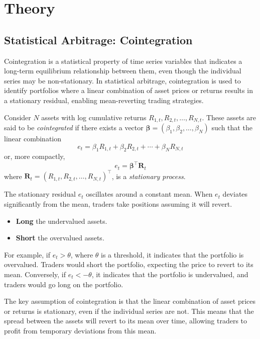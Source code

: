 \documentclass[12pt]{article}
\begin{document}

\section{Theory}

\subsection{Statistical Arbitrage: Cointegration}

Cointegration is a statistical property of time series variables that indicates a long-term equilibrium relationship between them, even though the individual series may be non-stationary. In statistical arbitrage, cointegration is used to identify portfolios where a linear combination of asset prices or returns results in a stationary residual, enabling mean-reverting trading strategies. 

Consider $N$ assets with log cumulative returns $R_{1,t}, R_{2,t}, \ldots, R_{N,t}$. These assets are said to be \textit{cointegrated} if there exists a vector $\boldsymbol{\beta} = (\beta_1, \beta_2, \ldots, \beta_N)$ such that the linear combination
\[
    e_t = \beta_1 R_{1,t} + \beta_2 R_{2,t} + \cdots + \beta_N R_{N,t}
\]
or, more compactly,
\begin{equation}
    e_t = \boldsymbol{\beta}^\top \mathbf{R}_t
    \label{eq:cointegration_all}
\end{equation}
where $\mathbf{R}_t = (R_{1,t}, R_{2,t}, \ldots, R_{N,t})^\top$, is a \textit{stationary process}.

The stationary residual $e_t$ oscillates around a constant mean. When $e_t$ deviates significantly from the mean, traders take positions assuming it will revert.
\begin{itemize}
  \item \textbf{Long} the undervalued assets.
  \item \textbf{Short} the overvalued assets.
\end{itemize}

For example, if $e_t > \theta$, where $\theta$ is a threshold, it indicates that the portfolio is overvalued. Traders would short the portfolio, expecting the price to revert to its mean. Conversely, if $e_t < -\theta$, it indicates that the portfolio is undervalued, and traders would go long on the portfolio.

The key assumption of cointegration is that the linear combination of asset prices or returns is stationary, even if the individual series are not. This means that the spread between the assets will revert to its mean over time, allowing traders to profit from temporary deviations from this mean.
\end{document}
